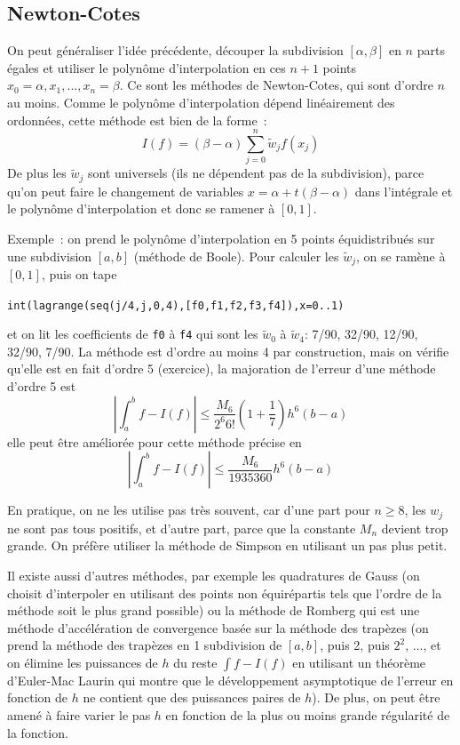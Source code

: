 \documentclass[a4paper,11pt]{article}
\begin{document}
\subsection{Newton-Cotes} 
On peut généraliser l'idée précédente, découper la subdivision 
$[\alpha,\beta]$ en $n$ parts \'egales et utiliser le polynôme d'interpolation
en ces $n+1$ points $x_0=\alpha, x_1, ..., x_n=\beta$. 
Ce sont les méthodes de Newton-Cotes,
qui sont d'ordre $n$ au moins. Comme le polyn\^ome d'interpolation
d\'epend lin\'eairement des ordonn\'ees, cette m\'ethode est bien
de la forme~:
\[ I(f)=(\beta-\alpha)\sum_{j=0}^n \tilde{w}_j f(x_j)\]
De plus les $\tilde{w}_j$ sont universels (ils ne d\'ependent pas de 
la subdivision), parce qu'on peut faire 
le changement de variables $x=\alpha+t(\beta-\alpha)$ dans l'int\'egrale
et le polyn\^ome d'interpolation et donc se ramener \`a $[0,1]$.

Exemple~: on prend le polyn\^ome d'interpolation en 5 points 
\'equidistribu\'es sur une subdivision $[a,b]$ (m\'ethode de Boole). 
Pour calculer les
$\tilde{w}_j$, on se ram\`ene \`a $[0,1]$, puis on tape
\begin{center}
\verb|int(lagrange(seq(j/4,j,0,4),[f0,f1,f2,f3,f4]),x=0..1)|
\end{center}
et on lit les coefficients de \verb|f0| \`a \verb|f4|
qui sont les $\tilde{w}_0$ \`a  $\tilde{w}_4$: 7/90, 32/90, 12/90, 32/90, 7/90.
La m\'ethode est d'ordre au moins 4 par construction, mais on v\'erifie
qu'elle est en fait d'ordre 5 (exercice), la majoration de l'erreur
d'une m\'ethode d'ordre 5 est 
\[ |\int_a^b f -I(f)| \leq \frac{M_6}{2^6 6!}(1+\frac{1}{7}) h^6 (b-a) \]
elle peut \^etre am\'elior\'ee pour cette m\'ethode pr\'ecise en
\[ |\int_a^b f -I(f)| \leq \frac{M_6}{1935360} h^6 (b-a) \]

En pratique, on ne les utilise pas très souvent, car d'une part
pour $n\geq 8$, les $w_j$ ne sont pas tous positifs, et
d'autre part, parce que la constante $M_n$ devient trop
grande. On préfère utiliser la méthode de Simpson en utilisant
un pas plus petit.

Il existe aussi d'autres méthodes, par exemple les quadratures de Gauss
(on choisit d'interpoler en utilisant des points non équirépartis 
tels que l'ordre de la méthode soit le plus grand possible)
ou la méthode de Romberg qui est une méthode d'accélération
de convergence basée sur la méthode des trapèzes (on prend
la méthode des trapèzes en 1 subdivision de $[a,b]$, puis
2, puis $2^2$, ..., et on élimine les puissances de $h$
du reste $\int f-I(f)$ en utilisant un théorème d'Euler-Mac Laurin
qui montre que le développement asymptotique de
l'erreur en fonction de $h$ ne contient que des puissances paires
de $h$). De plus, on peut être amené à faire varier le pas $h$
en fonction de la plus ou moins grande régularité de la fonction.
\end{document}
